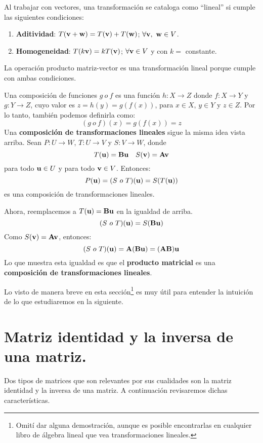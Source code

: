 \documentclass[12pt]{article}
\begin{document}
Al trabajar con vectores, una transformación se cataloga como ``lineal'' si cumple las siguientes condiciones:

\begin{enumerate}
\item \textbf{Aditividad}: $T(\mathbf{v} + \mathbf{w}) = T(\mathbf{v}) + T(\mathbf{w})$; $\forall \vecmat{v}, \ \vecmat{w} \in V$.
\item \textbf{Homogeneidad}: $T(k \mathbf{v}) = k T(\mathbf{v})$; $\forall \mathbf{v} \in V$ y con $k =$ constante.
\end{enumerate}

La operación producto matriz-vector es una transformación lineal porque cumple con ambas condiciones.

Una composición de funciones $g \ o \ f$ es una función $h:X \to Z$ donde $f:X \to Y$ y $g:Y \to Z$, cuyo valor es $z = h(y) = g(f(x))$, para $x \in X$, $y \in Y$ y $z \in Z$. Por lo tanto, también podemos definirla como:
\[
  (g \ o \ f)(x) = g(f(x)) = z
\]
Una \textbf{composición de transformaciones lineales} sigue la misma idea vista arriba. Sean $P:U \to W$, $T:U \to V$ y $S:V \to W$, donde
\[
  T(\mathbf{u}) = \mathbf{B} \mathbf{u} \quad
  S(\mathbf{v}) = \mathbf{A} \mathbf{v}
\]
para todo $\mathbf{u} \in U$ y para todo $\mathbf{v} \in V$. Entonces:
\[
  P(\mathbf{u}) = (S \ o \ T)(\mathbf{u}) = S(T(\mathbf{u}))
\]
es una composición de transformaciones lineales.

Ahora, reemplacemos a $T(\mathbf{u}) = \mathbf{B} \mathbf{u}$ en la igualdad de arriba.
\[
  (S \ o \ T)(\mathbf{u}) = S(\mathbf{B} \mathbf{u})
\]
Como $S(\mathbf{v}) = \mathbf{A} \mathbf{v}$, entonces:
\[
  (S \ o \ T)(\mathbf{u}) = \mathbf{A}(\mathbf{B} \mathbf{u}) = (\mathbf{A} \mathbf{B}) \mathbf{u}
\]
Lo que muestra esta igualdad es que el \textbf{producto matricial} es una \textbf{composición de transformaciones lineales}.

Lo visto de manera breve en esta sección\footnote{Omití dar alguna demostración, aunque es posible encontrarlas en cualquier libro de álgebra lineal que vea transformaciones lineales.} es muy útil para entender la intuición de lo que estudiaremos en la siguiente.


\section{Matriz identidad y la inversa de una matriz.}

Dos tipos de matrices que son relevantes por sus cualidades son la matriz identidad y la inversa de una matriz. A continuación revisaremos dichas características.
\end{document}
